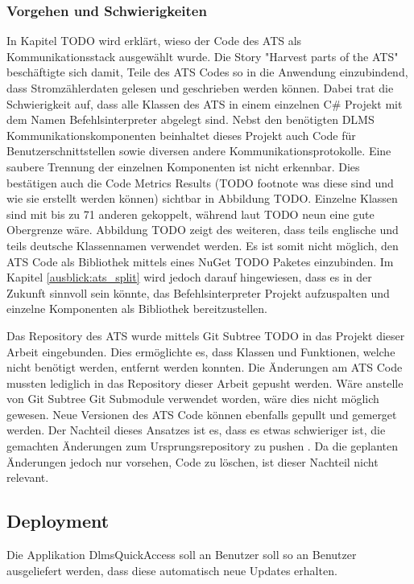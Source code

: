 \subsubsection{Vorgehen und Schwierigkeiten}

In Kapitel TODO wird erklärt, wieso der Code des \ac{ATS} als Kommunikationsstack ausgewählt wurde.
Die Story "Harvest parts of the ATS" beschäftigte sich damit, Teile des \ac{ATS} Codes so in die Anwendung einzubindend, dass Stromzählerdaten gelesen und geschrieben werden können.
Dabei trat die Schwierigkeit auf, dass alle Klassen des \ac{ATS} in einem einzelnen C\# Projekt mit dem Namen Befehlsinterpreter abgelegt sind.
Nebst den benötigten \ac{DLMS} Kommunikationskomponenten beinhaltet dieses Projekt auch Code für Benutzerschnittstellen sowie diversen andere Kommunikationsprotokolle.
Eine saubere Trennung der einzelnen Komponenten ist nicht erkennbar. 
Dies bestätigen auch die Code Metrics Results (TODO footnote was diese sind und wie sie erstellt werden können) sichtbar in Abbildung TODO.
Einzelne Klassen sind mit bis zu 71 anderen gekoppelt, während laut \parencite{quantitativeInvestigationRiskCodeMetrics} TODO neun eine gute Obergrenze wäre.
Abbildung TODO zeigt des weiteren, dass teils englische und teils deutsche Klassennamen verwendet werden.
Es ist somit nicht möglich, den \ac{ATS} Code als Bibliothek mittels eines NuGet TODO Paketes einzubinden.
Im Kapitel \ref{ausblick:ats_split} wird jedoch darauf hingewiesen, dass es in der Zukunft sinnvoll sein könnte,
das Befehlsinterpreter Projekt aufzuspalten und einzelne Komponenten als Bibliothek bereitzustellen.


Das Repository des \ac{ATS} wurde mittels Git Subtree TODO in das Projekt dieser Arbeit eingebunden. 
Dies ermöglichte es, dass Klassen und Funktionen, welche nicht benötigt werden, entfernt werden konnten.
Die Änderungen am \ac{ATS} Code mussten lediglich in das Repository dieser Arbeit gepusht werden.
Wäre anstelle von Git Subtree Git Submodule verwendet worden, wäre dies nicht möglich gewesen.
Neue Versionen des \ac{ATS} Code können ebenfalls gepullt und gemerget werden. 
Der Nachteil dieses Ansatzes ist es, dass es etwas schwieriger ist, die gemachten Änderungen zum Ursprungsrepository zu pushen \parencite{gitSubtree}.
Da die geplanten Änderungen jedoch nur vorsehen, Code zu löschen, ist dieser Nachteil nicht relevant.



\subsection{Deployment}
\dq Die Applikation DlmsQuickAccess soll an Benutzer soll so an Benutzer ausgeliefert werden, dass diese automatisch neue Updates erhalten.\dq

